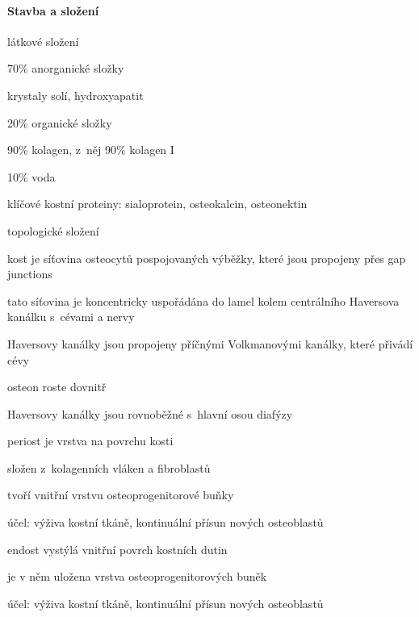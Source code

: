 \documentclass[DIV=8]{scrreprt}
\begin{document}
\paragraph{Stavba a složení}
\begin{myItemize}[nosep]
    \item látkové složení
\begin{myItemize}[nosep]
    \item 70\% anorganické složky
\begin{myItemize}[nosep]
    \item krystaly solí, hydroxyapatit
\end{myItemize}

    \item 20\% organické složky
\begin{myItemize}[nosep]
    \item 90\% kolagen, z něj 90\% kolagen I
\end{myItemize}

    \item 10\% voda
\end{myItemize}

    \item klíčové kostní proteiny: sialoprotein, osteokalcin, osteonektin
    \item topologické složení
\begin{myItemize}[nosep]
    \item kost je síťovina osteocytů pospojovaných výběžky, které jsou propojeny přes gap junctions
    \item tato síťovina je koncentricky uspořádána do lamel kolem centrálního Haversova kanálku s cévami a nervy
    \item Haversovy kanálky jsou propojeny příčnými Volkmanovými kanálky, které přivádí cévy
    \item osteon roste dovnitř
    \item Haversovy kanálky jsou rovnoběžné s hlavní osou diafýzy
\end{myItemize}

    \item periost je vrstva na povrchu kosti
\begin{myItemize}[nosep]
    \item složen z kolagenních vláken a fibroblastů
    \item tvoří vnitřní vrstvu osteoprogenitorové buňky
    \item účel: výživa kostní tkáně, kontinuální přísun nových osteoblastů
\end{myItemize}

    \item endost vystýlá vnitřní povrch kostních dutin
\begin{myItemize}[nosep]
    \item je v něm uložena vrstva osteoprogenitorových buněk
    \item účel: výživa kostní tkáně, kontinuální přísun nových osteoblastů
\end{myItemize}

\end{myItemize}
\end{document}
